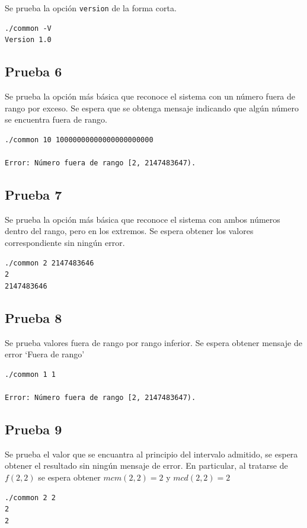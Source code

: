 \documentclass[titlepage,a4paper]{article}
\begin{document}
Se prueba la opción \verb|version| de la forma corta.
\begin{lstlisting}[style=test_run_style]
./common -V
Version 1.0
\end{lstlisting}

\subsection{Prueba 6}

Se prueba la opción más básica que reconoce el sistema con un número fuera de rango por exceso. Se espera que se obtenga mensaje indicando que algún número se encuentra fuera de rango.

\begin{lstlisting}[style=test_run_style]
./common 10 10000000000000000000000

Error: Número fuera de rango [2, 2147483647).

\end{lstlisting}

\subsection{Prueba 7}

Se prueba la opción más básica que reconoce el sistema con ambos números dentro del rango, pero en los extremos. Se espera obtener los valores correspondiente sin ningún error. 
\begin{lstlisting}[style=test_run_style]
./common 2 2147483646
2
2147483646

\end{lstlisting}

\subsection{Prueba 8}

Se prueba valores fuera de rango por rango inferior. Se espera obtener mensaje de error `Fuera de rango'
\begin{lstlisting}[style=test_run_style]
./common 1 1

Error: Número fuera de rango [2, 2147483647).

\end{lstlisting}

\subsection{Prueba 9}

Se prueba el valor que se encuantra al principio del intervalo admitido, se espera obtener el resultado sin ningún mensaje de error. En particular, al tratarse de $f(2, 2)$ se espera obtener $mcm(2, 2) = 2$ y $mcd(2, 2) = 2$
\begin{lstlisting}[style=test_run_style]
./common 2 2
2
2
\end{lstlisting}
\end{document}
